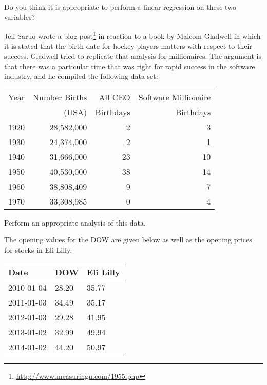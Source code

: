 \begin{problem}
\begin{subproblem}
      \vfill

    \item Do you think it is appropriate to perform a linear
      regression on these two variables?

      \vfill

    \end{subproblem}

    \clearpage

  \item Jeff Saruo wrote a blog
    post\footnote{\url{http://www.measuringu.com/1955.php}} in
    reaction to a book by Malcom Gladwell in which it is stated that
    the birth date for hockey players matters with respect to their
    success. Gladwell tried to replicate that analysis for
    millionaires. The argument is that there was a particular time
    that was right for rapid success in the software industry, and he
    compiled the following data set: \\
    \begin{tabular}{r|r|r|r}
      Year & Number Births & All CEO   & Software  Millionaire \\
           & (USA)         & Birthdays & Birthdays \\
      1920 & 28,582,000 &  2  &  3 \\
      1930 & 24,374,000 &  2  &  1 \\
      1940 & 31,666,000 &  23 & 10 \\
      1950 & 40,530,000 &  38 & 14 \\
      1960 & 38,808,409 &  9  &  7 \\
      1970 & 33,308,985 &  0  &  4
    \end{tabular}

    Perform an appropriate analysis of this data.

    \vfill

  \end{problem}


The opening values for the DOW are given below as well as the opening
prices for stocks in Eli Lilly.

\begin{tabular}{l|l|l}
  Date & DOW & Eli Lilly \\ \hline
  2010-01-04 & 28.20 & 35.77 \\
  2011-01-03 & 34.49 & 35.17 \\
  2012-01-03 & 29.28 & 41.95 \\
  2013-01-02 & 32.99 & 49.94 \\
  2014-01-02 & 44.20 & 50.97
\end{tabular}

